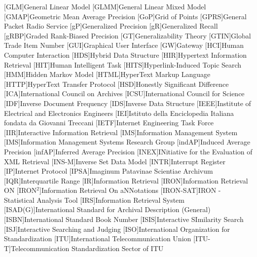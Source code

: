 [GLM]{General Linear Model}
[GLMM]{General Linear Mixed Model}
[GMAP]{Geometric Mean Average Precision}
[GoP]{Grid of Points}
[GPRS]{General Packet Radio Service}
[gP]{Generalized Precision}
[gR]{Generalized Recall}
[gRBP]{Graded Rank-Biased Precision}
[GT]{Generalizability Theory}
[GTIN]{Global Trade Item Number}
[GUI]{Graphical User Interface}
[GW]{Gateway}
[HCI]{Human Computer Interaction}
[HDS]{Hybrid Data Structure}
[HIR]{Hypertext Information Retrieval}
[HIT]{Human Intelligent Task}
[HITS]{Hyperlink-Induced Topic Search}
[HMM]{Hidden Markov Model}
[HTML]{HyperText Markup Language}
[HTTP]{HyperText Transfer Protocol}
[HSD]{Honestly Significant Difference}
[ICA]{International Council on Archives}
[ICSU]{International Council for Science}
[IDF]{Inverse Document Frequency}
[IDS]{Inverse Data Structure}
[IEEE]{Institute of Electrical and Electronics Engineers}
[IEI]{Istituto della Enciclopedia Italiana fondata da Giovanni Treccani}
[IETF]{Internet Engineering Task Force}
[IIR]{Interactive Information Retrieval}
[IMS]{Information Management System}
[IMS]{Information Management Systems Research Group}
[indAP]{Induced Average Precision}
[infAP]{Inferred Average Precision}
[INEX]{INitiative for the Evaluation of \acs{XML} Retrieval}
[INS-M]{Inverse Set Data Model}
[INTR]{Interrupt Register}
[IP]{Internet Protocol}
[IPSA]{Imaginum Patavinae Scientiae Archivum}
[IQR]{Interquartile Range}
[IR]{Information Retrieval}
[IRON]{Information Retrieval ON}
[IRON$^2$]{Information Retrieval On aNNotations}
[IRON-SAT]{\acs{IRON} - Statistical Analysis Tool}
[IRS]{Information Retrieval System}
[ISAD(G)]{International Standard for Archival Description (General)}
[ISBN]{International Standard Book Number}
[ISIS]{Interactive SImilarity Search}
[ISJ]{Interactive Searching and Judging}
[ISO]{International Organization for Standardization}
[ITU]{International Telecommunication Union }
[ITU-T]{Telecommunication Standardization Sector of \acs{ITU}}

